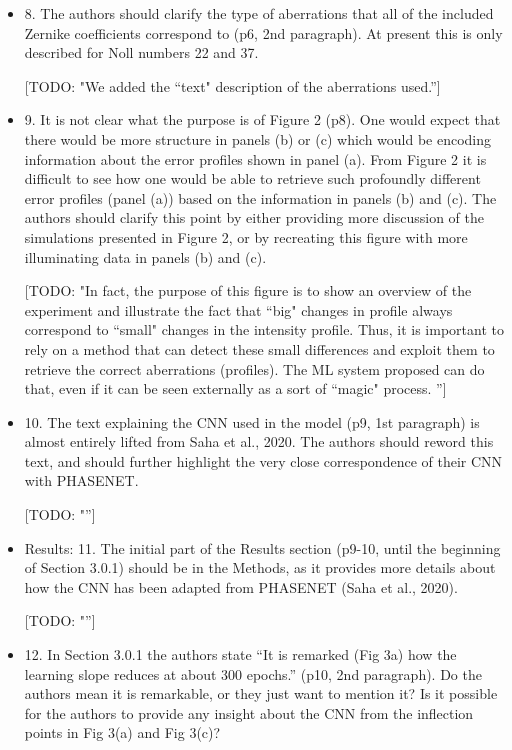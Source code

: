 \documentclass[11pt]{letter} %
\newcommand{\todo}[1]{{\color{red}[TODO: "#1'']}}
\begin{document}
\begin{letter}{}
\begin{itemize}
    \todo{We changed the workspace in Fig. 1 and supressed the unused slits.}
    

    \item 8. The authors should clarify the type of aberrations that all of the included Zernike coefficients correspond to (p6, 2nd paragraph). At present this is only described for Noll numbers 22 and 37.
    
    \todo{We added the ``text" description of the aberrations used.}
    

    \item 9. It is not clear what the purpose is of Figure 2 (p8). One would expect that there would be more structure in panels (b) or (c) which would be encoding information about the error profiles shown in panel (a). From Figure 2 it is difficult to see how one would be able to retrieve such profoundly different error profiles (panel (a)) based on the information in panels (b) and (c). The authors should clarify this point by either providing more discussion of the simulations presented in Figure 2, or by recreating this figure with more illuminating data in panels (b) and (c).
    
    \todo{In fact, the purpose of this figure is to show an overview of the experiment and illustrate the fact that ``big" changes in profile always correspond to ``small" changes in the intensity profile. Thus, it is important to rely on a method that can detect these small differences and exploit them to retrieve the correct aberrations (profiles). The ML system proposed can do that, even if it can be seen externally as a sort of ``magic" process. }
    

    \item 10. The text explaining the CNN used in the model (p9, 1st paragraph) is almost entirely lifted from Saha et al., 2020. The authors should reword this text, and should further highlight the very close correspondence of their CNN with PHASENET.
        
    \todo{}
    
    \item Results: 11. The initial part of the Results section (p9-10, until the beginning of Section 3.0.1) should be in the Methods, as it provides more details about how the CNN has been adapted from PHASENET (Saha et al., 2020).
    
    \todo{}
    
    \item 12. In Section 3.0.1 the authors state “It is remarked (Fig 3a) how the learning slope reduces at about 300 epochs.” (p10, 2nd paragraph). Do the authors mean it is remarkable, or they just want to mention it? Is it possible for the authors to provide any insight about the CNN from the inflection points in Fig 3(a) and Fig 3(c)?
    

\end{itemize}
\end{letter}
\end{document}
